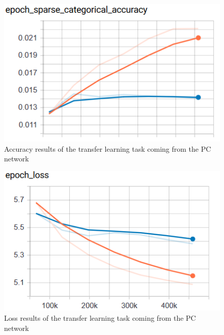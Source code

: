 \begin{figure}[!ht]
    \centering
    \includegraphics[scale=0.60]{images/TL_PC_acc.png}
    \caption{Accuracy results of the transfer learning task coming from the PC network}
    \label{fig:TL_PC_acc}
\end{figure}
\begin{figure}[!ht]
    \centering
    \includegraphics[scale=0.60]{images/TL_PC_loss.png}
    \caption{Loss results of the transfer learning task coming from the PC network}
    \label{fig:TL_PC_loss}
\end{figure}

